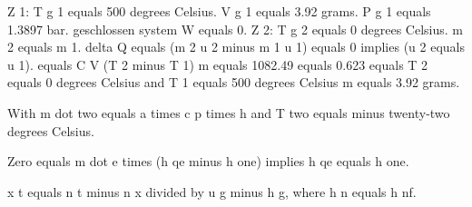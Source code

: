 Z 1:  
T g 1 equals 500 degrees Celsius.  
V g 1 equals 3.92 grams.  
P g 1 equals 1.3897 bar.  
geschlossen system W equals 0.  
Z 2:  
T g 2 equals 0 degrees Celsius.  
m 2 equals m 1.  
delta Q equals (m 2 u 2 minus m 1 u 1) equals 0 implies (u 2 equals u 1).  
equals C V (T 2 minus T 1) m equals 1082.49 equals 0.623 equals T 2 equals 0 degrees Celsius and T 1 equals 500 degrees Celsius m equals 3.92 grams.

With m dot two equals a times c p times h and T two equals minus twenty-two degrees Celsius.

Zero equals m dot e times (h qe minus h one) implies h qe equals h one.

x t equals n t minus n x divided by u g minus h g, where h n equals h nf.
